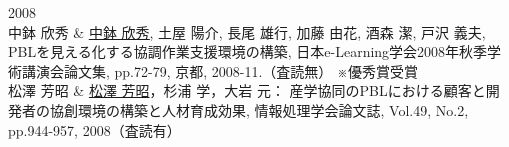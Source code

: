 \documentclass[11pt,a4paper,twoside]{jarticle}
\newcommand{\研究種別}{C}	%
\newcommand{\研究課題名}{コ・クリエイティブなソフトウェア開発者を育成するPBL型教育}
\newcommand{\研究機関名}{産業技術大学院大学}
\newcommand{\研究代表者氏名}{中鉢　欣秀}
\newcommand{\研究代表者氏名ふりがな}{ちゅうばち　よしひで}
\newcommand{\me}{\underline{\underline{中鉢 欣秀}}}
\newcommand{\本応募effort}{\KLEffort{18}}	%
\newcommand{\研究期間の最終元号年度}{27}	%
\begin{document}
{	2008 \\
		中鉢 欣秀
		&  \KLbibitem \me, 土屋 陽介, 長尾 雄行, 加藤 由花, 酒森 潔, 戸沢 義夫, PBLを見える化する協調作業支援環境の構築, 日本e-Learning学会2008年秋季学術講演会論文集, pp.72-79, 京都, 2008-11.（査読無） ※優秀賞受賞 \\
		松澤 芳昭
		& \KLbibitem \label{pub:matsuzawa-2008} \underline{松澤 芳昭}，杉浦 学，大岩 元： 産学協同のPBLにおける顧客と開発者の協創環境の構築と人材育成効果, 情報処理学会論文誌,  Vol.49, No.2, pp.944-957, 2008（査読有） \\
}

\newcommand{\連携研究者の研究業績}{%
}
\end{document}
